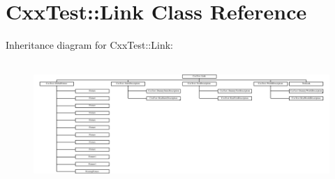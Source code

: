 \hypertarget{classCxxTest_1_1Link}{\section{Cxx\-Test\-:\-:Link Class Reference}
\label{classCxxTest_1_1Link}
}
Inheritance diagram for Cxx\-Test\-:\-:Link\-:\begin{figure}[H]
\begin{center}
\leavevmode
\includegraphics[height=4.711538cm]{classCxxTest_1_1Link}
\end{center}
\end{figure}
